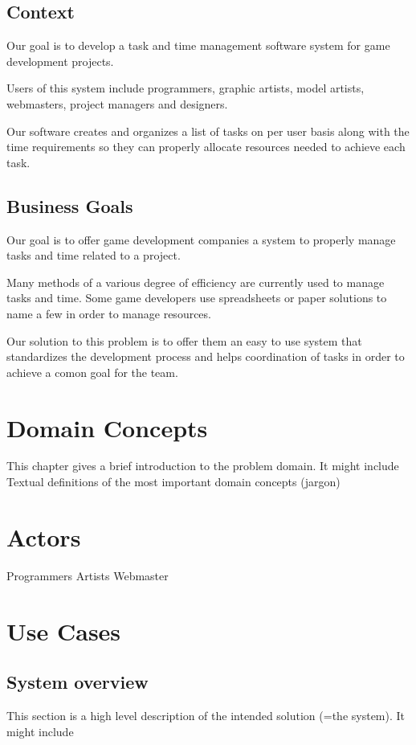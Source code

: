 \documentclass[12pt]{article}
\begin{document}
\subsection{Context}
Our goal is to develop a task and time management software system for game development projects. 

Users of this system include programmers, graphic artists, model artists, webmasters, project managers and designers.

Our software creates and organizes a list of tasks on per user basis along with the time requirements so they can properly allocate resources needed to achieve each task.
\subsection{Business Goals}
Our goal is to offer game development companies a system to properly manage tasks and time related to a project.

Many methods of a various degree of efficiency are currently used to manage tasks and time. Some game developers use spreadsheets or paper solutions to name a few in order to manage resources.

Our solution to this problem is to offer them an easy to use system that standardizes the development process and helps coordination of tasks in order to achieve a comon goal for the team.
\section{Domain Concepts}


This chapter gives a brief introduction to the problem domain. It might include
    Textual definitions of the most important domain concepts (jargon)

\section{Actors}
Programmers
Artists
Webmaster


\section{Use Cases}

\subsection{System overview}
This section is a high level description of the intended solution (=the system). It might include
\end{document}
